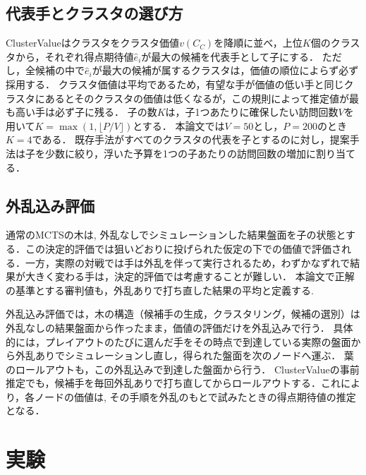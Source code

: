 \documentclass[submit]{ipsj}
\begin{document}
\subsection{代表手とクラスタの選び方}
\label{sec:method-select}
ClusterValueはクラスタをクラスタ価値$v(C_C)$を降順に並べ，上位$K$個のクラスタから，それぞれ得点期待値$\hat{e}_i$が最大の候補を代表手として子にする．
ただし，全候補の中で$\hat{e}_i$が最大の候補が属するクラスタは，価値の順位によらず必ず採用する．
クラスタ価値は平均であるため，有望な手が価値の低い手と同じクラスタにあるとそのクラスタの価値は低くなるが，この規則によって推定値が最も高い手は必ず子に残る．
子の数$K$は，子1つあたりに確保したい訪問回数$V$を用いて$K=\max(1, \lfloor P/V \rfloor)$とする．
本論文では$V=50$とし，$P=200$のとき$K=4$である．
既存手法がすべてのクラスタの代表を子とするのに対し，提案手法は子を少数に絞り，浮いた予算を1つの子あたりの訪問回数の増加に割り当てる．

\subsection{外乱込み評価}
\label{sec:method-noisy}
通常のMCTSの木は, 外乱なしでシミュレーションした結果盤面を子の状態とする．この決定的評価では狙いどおりに投げられた仮定の下での価値で評価される．一方，実際の対戦では手は外乱を伴って実行されるため，わずかなずれで結果が大きく変わる手は，決定的評価では考慮することが難しい．
本論文で正解の基準とする審判値も，外乱ありで打ち直した結果の平均と定義する.

外乱込み評価では，木の構造（候補手の生成，クラスタリング，候補の選別）は外乱なしの結果盤面から作ったまま，価値の評価だけを外乱込みで行う．
具体的には，プレイアウトのたびに選んだ手をその時点で到達している実際の盤面から外乱ありでシミュレーションし直し，得られた盤面を次のノードへ運ぶ．
葉のロールアウトも，この外乱込みで到達した盤面から行う．
ClusterValueの事前推定でも，候補手を毎回外乱ありで打ち直してからロールアウトする．これにより，各ノードの価値は, その手順を外乱のもとで試みたときの得点期待値の推定となる．

\section{実験}
\end{document}
